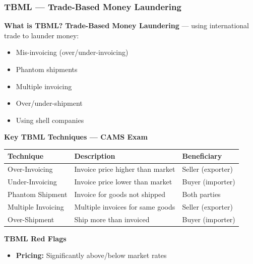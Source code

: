 \documentclass[12pt,aspectratio=169]{beamer}
\renewcommand{\scriptsize}{\fontsize{4.5}{5.5}\selectfont}
\newcommand{\keypoint}[1]{\textcolor{deepblue}{\textbf{#1}}}
\begin{document}
	\begin{frame}
		\frametitle{\fontsize{11}{13}\selectfont \textbf{TBML — Trade-Based Money Laundering}}
		\begin{block}{\fontsize{7}{9}\selectfont \textbf{What is TBML?}}
			\scriptsize
			\textbf{Trade-Based Money Laundering} — using international trade to launder money:
			\begin{itemize}
				\item Mis-invoicing (over/under-invoicing)
				\item Phantom shipments
				\item Multiple invoicing
				\item Over/under-shipment
				\item Using shell companies
			\end{itemize}
		\end{block}
		\vspace{0.02cm}
		\begin{block}{\fontsize{7}{9}\selectfont \textbf{Key TBML Techniques — CAMS Exam}}
			\scriptsize
			\begin{tabular}{|p{}|p{}|p{0.31\textwidth}|}
				\hline
				\keypoint{Technique} & \keypoint{Description} & \keypoint{Beneficiary} \\
				\hline
				Over-Invoicing & Invoice price higher than market & Seller (exporter) \\
				\hline
				Under-Invoicing & Invoice price lower than market & Buyer (importer) \\
				\hline
				Phantom Shipment & Invoice for goods not shipped & Both parties \\
				\hline
				Multiple Invoicing & Multiple invoices for same goods & Seller (exporter) \\
				\hline
				Over-Shipment & Ship more than invoiced & Buyer (importer) \\
				\hline
			\end{tabular}
		\end{block}
		\vspace{0.02cm}
		\begin{block}{\fontsize{7}{9}\selectfont \textbf{TBML Red Flags}}
			\scriptsize
			\begin{itemize}
				\item \textbf{Pricing:} Significantly above/below market rates

\end{itemize}
\end{block}
\end{frame}
\end{document}
